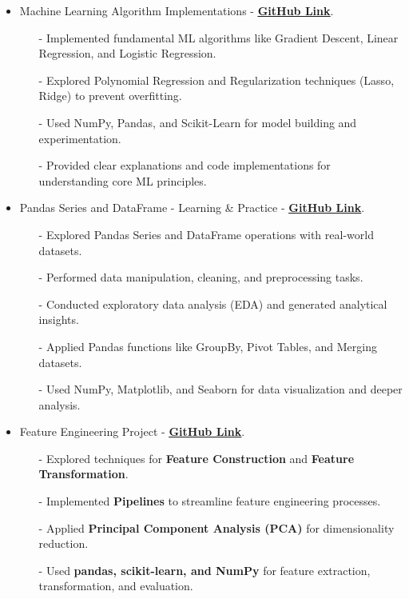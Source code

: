 \documentclass[letterpaper,11pt]{article}
\begin{document}
\begin{itemize}[left=0cm]
    \item Machine Learning Algorithm Implementations - \href{https://github.com/ShahidulHaqueShaheeen/ML_Algorithms.git}{\underline{\textbf{GitHub Link}}}.
    \begin{itemize}[left=0cm]
        \item[-] \small \justifying Implemented fundamental ML algorithms like Gradient Descent, Linear Regression, and Logistic Regression.
        \item[-] \small \justifying Explored Polynomial Regression and Regularization techniques (Lasso, Ridge) to prevent overfitting.
        \item[-] \small \justifying Used NumPy, Pandas, and Scikit-Learn for model building and experimentation.
        \item[-] \small \justifying Provided clear explanations and code implementations for understanding core ML principles.
    \end{itemize}

    \item Pandas Series and DataFrame - Learning \& Practice - \href{https://github.com/ShahidulHaqueShaheeen/Exploring-Data-with-Pandas.git}{\underline{\textbf{GitHub Link}}}.
    \begin{itemize}[left=0cm]
        \item[-] \small \justifying Explored Pandas Series and DataFrame operations with real-world datasets.
        \item[-] \small \justifying Performed data manipulation, cleaning, and preprocessing tasks.
        \item[-] \small \justifying Conducted exploratory data analysis (EDA) and generated analytical insights.
        \item[-] \small \justifying Applied Pandas functions like GroupBy, Pivot Tables, and Merging datasets.
        \item[-] \small \justifying Used NumPy, Matplotlib, and Seaborn for data visualization and deeper analysis.
    \end{itemize}

    \item Feature Engineering Project - \href{https://github.com/ShahidulHaqueShaheeen/Feature_Engineering.git}{\underline{\textbf{GitHub Link}}}.
    \begin{itemize}[left=0cm]
        \item[-] \small \justifying Explored techniques for \textbf{Feature Construction} and \textbf{Feature Transformation}.
        \item[-] \small \justifying Implemented \textbf{Pipelines} to streamline feature engineering processes.
        \item[-] \small \justifying Applied \textbf{Principal Component Analysis (PCA)} for dimensionality reduction.
        \item[-] \small \justifying Used \textbf{pandas, scikit-learn, and NumPy} for feature extraction, transformation, and evaluation.
    \end{itemize}

\end{itemize}
\end{document}
